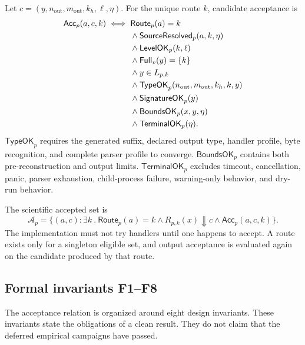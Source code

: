 Let $c=(y,n_{\mathrm{out}},m_{\mathrm{out}},k_h,\ell,\eta)$. For the unique
route $k$, candidate acceptance is
\begin{align}
\mathsf{Acc}_{p}(a,c,k)\iff{}&
 \mathsf{Route}_{p}(a)=k \notag\\
&\land \mathsf{SourceResolved}_{p}(a,k,\eta) \notag\\
&\land \mathsf{LevelOK}_{p}(k,\ell) \notag\\
&\land \mathsf{Full}_{v}(y)=\{k\} \notag\\
&\land y\in L_{p,k} \notag\\
&\land \mathsf{TypeOK}_{p}(n_{\mathrm{out}},m_{\mathrm{out}},k_h,k,y) \notag\\
&\land \mathsf{SignatureOK}_{p}(y) \notag\\
&\land \mathsf{BoundsOK}_{p}(x,y,\eta) \notag\\
&\land \mathsf{TerminalOK}_{p}(\eta).
\label{eq:extended-acceptance}
\end{align}
$\mathsf{TypeOK}_p$ requires the generated suffix, declared output type,
handler profile, byte recognition, and complete parser profile to converge.
$\mathsf{BoundsOK}_p$ contains both pre-reconstruction and output limits.
$\mathsf{TerminalOK}_p$ excludes timeout, cancellation, panic, parser
exhaustion, child-process failure, warning-only behavior, and dry-run behavior.

The scientific accepted set is
\begin{equation}
  \mathcal{A}_{p}=
  \{(a,c):\exists k\ .\
  \mathsf{Route}_{p}(a)=k\land
  R_{p,k}(x)\Downarrow c\land
  \mathsf{Acc}_{p}(a,c,k)\}.
  \label{eq:accepted-set}
\end{equation}
The implementation must not try handlers until one happens to accept. A route
exists only for a singleton eligible set, and output acceptance is evaluated
again on the candidate produced by that route.

\subsection{Formal invariants F1--F8}

The acceptance relation is organized around eight design invariants. These
invariants state the obligations of a clean result. They do not claim that the
deferred empirical campaigns have passed.

